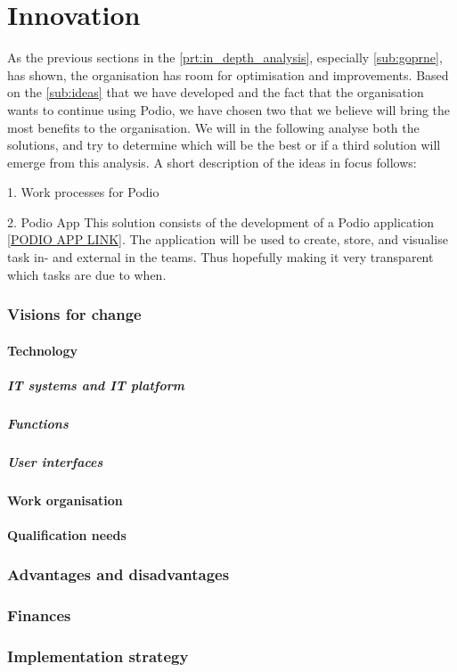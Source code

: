 \part{Innovation}
As the previous sections in the \ref{prt:in_depth_analysis}, especially \ref{sub:goprne}, has shown,
the organisation has room for optimisation and improvements. Based on the \ref{sub:ideas} that we
have developed and the fact that the organisation wants to continue using Podio, we have chosen two that we believe will bring the most benefits to the organisation.
We will in the following analyse both the solutions, and try to determine which will be the best or
if a third solution will emerge from this analysis. A short description of the ideas in focus
follows:

1. Work processes for Podio

2. Podio App
This solution consists of the development of a Podio application \ref{PODIO APP LINK}. The
application will be used to create, store, and visualise task in- and external in the teams. Thus
hopefully making it very transparent which tasks are due to when.

\section{Visions for change}

\subsection{Technology}
\label{sub:technology}

\subsubsection{IT systems and IT platform}

\subsubsection{Functions}

\subsubsection{User interfaces}

\subsection{Work organisation}
\label{sub:work_organisation}

\subsection{Qualification needs}
\label{sub:qualification_needs}

\section{Advantages and disadvantages}

\section{Finances}

\section{Implementation strategy}


